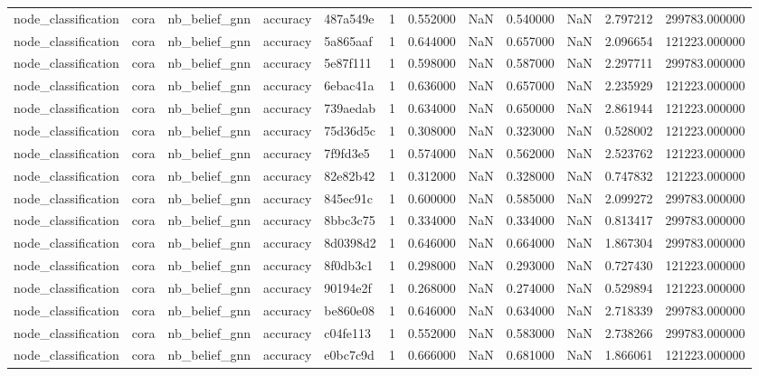 \begin{tabular}{lllllrrrrrrr}
node_classification & cora & nb_belief_gnn & accuracy & 487a549e & 1 & 0.552000 & NaN & 0.540000 & NaN & 2.797212 & 299783.000000 \\
node_classification & cora & nb_belief_gnn & accuracy & 5a865aaf & 1 & 0.644000 & NaN & 0.657000 & NaN & 2.096654 & 121223.000000 \\
node_classification & cora & nb_belief_gnn & accuracy & 5e87f111 & 1 & 0.598000 & NaN & 0.587000 & NaN & 2.297711 & 299783.000000 \\
node_classification & cora & nb_belief_gnn & accuracy & 6ebac41a & 1 & 0.636000 & NaN & 0.657000 & NaN & 2.235929 & 121223.000000 \\
node_classification & cora & nb_belief_gnn & accuracy & 739aedab & 1 & 0.634000 & NaN & 0.650000 & NaN & 2.861944 & 121223.000000 \\
node_classification & cora & nb_belief_gnn & accuracy & 75d36d5c & 1 & 0.308000 & NaN & 0.323000 & NaN & 0.528002 & 121223.000000 \\
node_classification & cora & nb_belief_gnn & accuracy & 7f9fd3e5 & 1 & 0.574000 & NaN & 0.562000 & NaN & 2.523762 & 121223.000000 \\
node_classification & cora & nb_belief_gnn & accuracy & 82e82b42 & 1 & 0.312000 & NaN & 0.328000 & NaN & 0.747832 & 121223.000000 \\
node_classification & cora & nb_belief_gnn & accuracy & 845ec91c & 1 & 0.600000 & NaN & 0.585000 & NaN & 2.099272 & 299783.000000 \\
node_classification & cora & nb_belief_gnn & accuracy & 8bbc3c75 & 1 & 0.334000 & NaN & 0.334000 & NaN & 0.813417 & 299783.000000 \\
node_classification & cora & nb_belief_gnn & accuracy & 8d0398d2 & 1 & 0.646000 & NaN & 0.664000 & NaN & 1.867304 & 299783.000000 \\
node_classification & cora & nb_belief_gnn & accuracy & 8f0db3c1 & 1 & 0.298000 & NaN & 0.293000 & NaN & 0.727430 & 121223.000000 \\
node_classification & cora & nb_belief_gnn & accuracy & 90194e2f & 1 & 0.268000 & NaN & 0.274000 & NaN & 0.529894 & 121223.000000 \\
node_classification & cora & nb_belief_gnn & accuracy & be860e08 & 1 & 0.646000 & NaN & 0.634000 & NaN & 2.718339 & 299783.000000 \\
node_classification & cora & nb_belief_gnn & accuracy & c04fe113 & 1 & 0.552000 & NaN & 0.583000 & NaN & 2.738266 & 299783.000000 \\
node_classification & cora & nb_belief_gnn & accuracy & e0bc7c9d & 1 & 0.666000 & NaN & 0.681000 & NaN & 1.866061 & 121223.000000 \\

\end{tabular}
